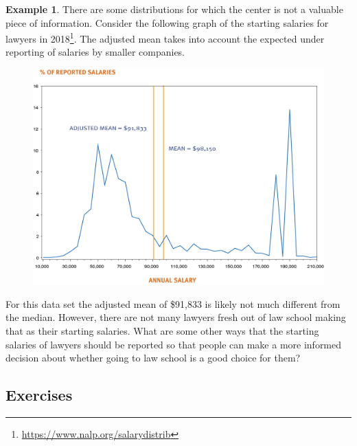 \documentclass[
]{book}
\theoremstyle{definition}
\theoremstyle{definition}
\newtheorem{example}{Example}[chapter]
\theoremstyle{definition}
\theoremstyle{definition}
\theoremstyle{remark}
\begin{document}
\begin{example}
There are some distributions for which the center is not a valuable piece of information. Consider the following graph of the starting salaries for lawyers in 2018\footnote{\url{https://www.nalp.org/salarydistrib}}. The adjusted mean takes into account the expected under reporting of salaries by smaller companies.

\begin{figure}

{\centering \includegraphics[width=0.7\linewidth]{images/Lawyer_starting_salaries} 

}

\end{figure}

For this data set the adjusted mean of \$91,833 is likely not much different from the median. However, there are not many lawyers fresh out of law school making that as their starting salaries. What are some other ways that the starting salaries of lawyers should be reported so that people can make a more informed decision about whether going to law school is a good choice for them?
\end{example}

\hypertarget{exercises-63}{%
\subsection{Exercises}\label{exercises-63}}
\end{document}
